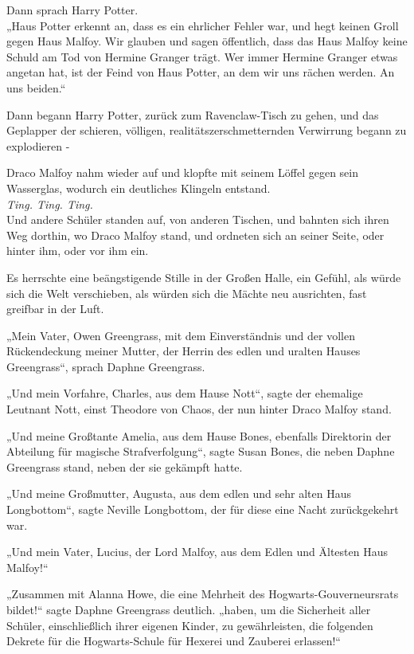 {Dann sprach Harry Potter.\\ „Haus Potter erkennt an, dass es ein ehrlicher Fehler war, und hegt keinen Groll gegen Haus Malfoy. Wir glauben und sagen öffentlich, dass das Haus Malfoy keine Schuld am Tod von Hermine Granger trägt. Wer immer Hermine Granger etwas angetan hat, ist der Feind von Haus Potter, an dem wir uns rächen werden. An uns beiden.“

Dann begann Harry Potter, zurück zum Ravenclaw-Tisch zu gehen, und das Geplapper der schieren, völligen, realitätszerschmetternden Verwirrung begann zu explodieren -

Draco Malfoy nahm wieder auf und klopfte mit seinem Löffel gegen sein Wasserglas, wodurch ein deutliches Klingeln entstand.\\ \emph{Ting. Ting. Ting.}\\ Und andere Schüler standen auf, von anderen Tischen, und bahnten sich ihren Weg dorthin, wo Draco Malfoy stand, und ordneten sich an seiner Seite, oder hinter ihm, oder vor ihm ein.

Es herrschte eine beängstigende Stille in der Großen Halle, ein Gefühl, als würde sich die Welt verschieben, als würden sich die Mächte neu ausrichten, fast greifbar in der Luft.

„Mein Vater, Owen Greengrass, mit dem Einverständnis und der vollen Rückendeckung meiner Mutter, der Herrin des edlen und uralten Hauses Greengrass“, sprach Daphne Greengrass.

„Und mein Vorfahre, Charles, aus dem Hause Nott“, sagte der ehemalige Leutnant Nott, einst Theodore von Chaos, der nun hinter Draco Malfoy stand.

„Und meine Großtante Amelia, aus dem Hause Bones, ebenfalls Direktorin der Abteilung für magische Strafverfolgung“, sagte Susan Bones, die neben Daphne Greengrass stand, neben der sie gekämpft hatte.

„Und meine Großmutter, Augusta, aus dem edlen und sehr alten Haus Longbottom“, sagte Neville Longbottom, der für diese eine Nacht zurückgekehrt war.

„Und mein Vater, Lucius, der Lord Malfoy, aus dem Edlen und Ältesten Haus Malfoy!“

„Zusammen mit Alanna Howe, die eine Mehrheit des Hogwarts-Gouverneursrats bildet!“ sagte Daphne Greengrass deutlich. „haben, um die Sicherheit aller Schüler, einschließlich ihrer eigenen Kinder, zu gewährleisten, die folgenden Dekrete für die Hogwarts-Schule für Hexerei und Zauberei erlassen!“

}
